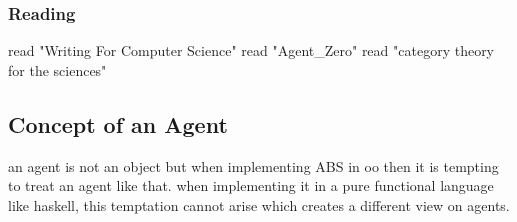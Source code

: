 \subsubsection{Reading}
read "Writing For Computer Science"
read "Agent\_Zero"
read "category theory for the sciences"


\subsection{Concept of an Agent}
an agent is not an object but when implementing ABS in oo then it is tempting to treat an agent like that. when implementing it in a pure functional language like haskell, this temptation cannot arise which creates a different view on agents.

